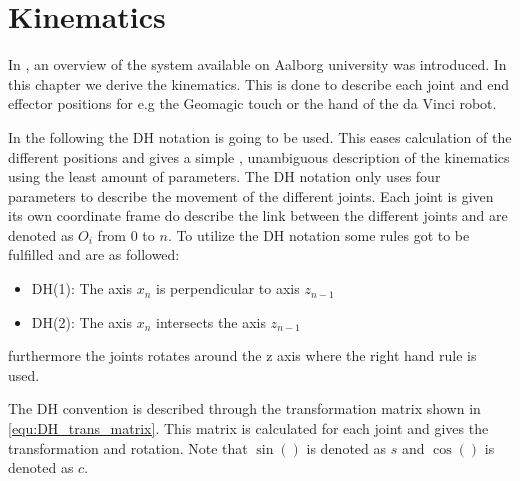 \chapter{Kinematics}\label{cha:kinematic}

In , an overview of the system available on Aalborg university was introduced. In this chapter we derive the kinematics. This is done to describe each joint and end effector positions for e.g the Geomagic touch or the hand of the da Vinci robot. 

In the following the \gls{DH} notation is going to be used\cite{spong2008robot}. This eases calculation of the different positions and gives a simple , unambiguous description of the kinematics using the least amount of parameters. The \gls{DH} notation only uses four parameters to describe the movement of the different joints. Each joint is given its own coordinate frame do describe the link between the different joints and are denoted as $O_i$ from 0 to $n$. To utilize the \gls{DH} notation some rules got to be fulfilled and are as followed:

\begin{itemize}
\item DH(1): The axis $x_n$ is perpendicular to axis $z_{n-1}$
\item DH(2): The axis $x_n$ intersects the axis $z_{n-1}$
\end{itemize}

furthermore the joints rotates around the z axis where the right hand rule is used.

The \gls{DH} convention is described through the transformation matrix shown in \eqref{equ:DH_trans_matrix}. This matrix is calculated for each joint and gives the transformation and rotation. Note that $\sin()$ is denoted as $s$ and $\cos()$ is denoted as $c$.

